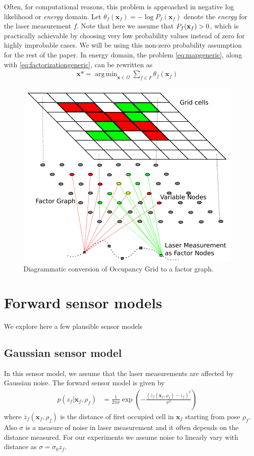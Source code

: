\documentclass[letterpaper, 10 pt, conference]{ieeeconf} %
\DeclareMathOperator*{\argmin}{arg\,min}
\newcommand{\vect}[1]{\mathbf{#1}}
\begin{document}
Often, for computational reasons, this problem is approached in negative log
likelihood or \emph{energy} domain. Let 
$\theta_f(\vect{x}_f) = - \log P_f(\vect{x}_f)$ 
denote the \emph{energy} for the laser measurement $f$. Note that here we
assume that $P_f(\map_f) > 0$, which is practically achievable by
choosing very low probability values instead of zero for highly improbable
cases. We will be using this non-zero probability assumption for the rest of the paper. 
In energy domain, the problem \eqref{eq:mapgeneric}, along with
\eqref{eq:factorizationgeneric}, can be rewritten as
\begin{align}
  \vect{x}* = \argmin_{\vect{x} \in \Omega} \sum_{f \in F} \theta_f(\vect{x}_f)
\end{align}
\begin{figure}
  \includegraphics[width=\columnwidth]{../figures/factorgraph/factorgraph.pdf}
  \caption{Diagrammatic conversion of Occupancy Grid to a factor graph.}
  \label{fig:factor-graph}
\end{figure}

\section{Forward sensor models}
We explore here a few plausible sensor models
\subsection{Gaussian sensor model}
\newcommand{\actz}{\bar{z}_f(\vect{x}_f, \rho_f)}
In this sensor model, we assume that the laser measurements are affected by Gaussian noise. The forward sensor model is given by
\begin{align}
  p(z_f|\vect{x}_f, \rho_f) &= \frac{1}{2\pi\sigma}\exp\left(-\frac{(\actz - z_f)^2}{\sigma^2}\right)
  \label{eq:gaussiansensormodel}
\end{align}
where $\actz$ is the distance of first occupied cell in $\vect{x}_f$ starting from pose $\rho_f$. Also $\sigma$ is a measure of noise in laser measurement and it often depends on the distance measured. For our experiments we assume noise to linearly vary with distance as $\sigma = \sigma_0z_f$. 
\end{document}
